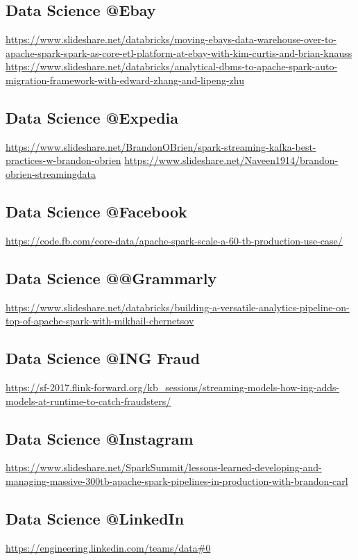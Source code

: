 \documentclass[12pt]{scrartcl} %
\begin{document}
\subsection{Data Science @Ebay}
\url{https://www.slideshare.net/databricks/moving-ebays-data-warehouse-over-to-apache-spark-spark-as-core-etl-platform-at-ebay-with-kim-curtis-and-brian-knauss}
\url{https://www.slideshare.net/databricks/analytical-dbms-to-apache-spark-auto-migration-framework-with-edward-zhang-and-lipeng-zhu}

\subsection{Data Science @Expedia}
\url{https://www.slideshare.net/BrandonOBrien/spark-streaming-kafka-best-practices-w-brandon-obrien}
\url{https://www.slideshare.net/Naveen1914/brandon-obrien-streamingdata}

\subsection{Data Science @Facebook}
\url{https://code.fb.com/core-data/apache-spark-scale-a-60-tb-production-use-case/}

\subsection{Data Science @@Grammarly}
\url{https://www.slideshare.net/databricks/building-a-versatile-analytics-pipeline-on-top-of-apache-spark-with-mikhail-chernetsov}

\subsection{Data Science @ING Fraud}
\url{https://sf-2017.flink-forward.org/kb_sessions/streaming-models-how-ing-adds-models-at-runtime-to-catch-fraudsters/}

\subsection{Data Science @Instagram}
\url{https://www.slideshare.net/SparkSummit/lessons-learned-developing-and-managing-massive-300tb-apache-spark-pipelines-in-production-with-brandon-carl}

\subsection{Data Science @LinkedIn}
\url{https://engineering.linkedin.com/teams/data#0}
\end{document}
